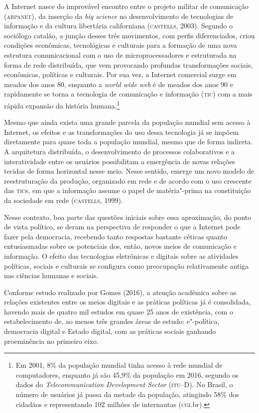 {\noindent{}A Internet nasce do improvável encontro entre o projeto militar de
comunicação (\textsc{arpanet}), da inserção da \textit{big science} no
desenvolvimento de tecnologias de informação e da cultura libertária
californiana (\textsc{castells}, 2003). Segundo o sociólogo catalão, a junção
desses três movimentos, com perfis diferenciados, criou condições
econômicas, tecnológicas e culturais para a formação de uma nova
estrutura comunicacional com o uso de microprocessadores e estruturada
na forma de rede distribuída, que vem provocando profundas
transformações sociais, econômicas, políticas e culturais. Por sua vez,
a Internet comercial surge em meados dos anos 80, enquanto a \textit{world
wide web} é de meados dos anos 90 e rapidamente se torna a tecnologia de
comunicação e informação (\textsc{tic}) com a mais rápida expansão da história
humana.\footnote{Em 2001, 8\% da população mundial tinha acesso à rede
  mundial de computadores, enquanto já são 45,9\% da população em 2016,
  segundo os dados do \textit{Telecommunication Development Sector}
  (\textsc{itu}--D). No Brasil, o número de usuários já passa da metade da
  população, atingindo 58\% dos cidadãos e representando 102 milhões de
  internautas (\textsc{cgi}.br).}

Mesmo que ainda exista uma grande parcela da população mundial sem
acesso à Internet, os efeitos e as transformações do uso dessa
tecnologia já se impõem diretamente para quase toda a população mundial,
mesmo que de forma indireta. A arquitetura distribuída, o
desenvolvimento de processos colaborativos e a interatividade entre os
usuários possibilitam a emergência de novas relações tecidas de forma
horizontal nesse meio. Nesse sentido, emerge um novo modelo de
reestruturação da produção, organizado em rede e de acordo com o uso
crescente das \textsc{tic}s, em que a informação assume o papel de matéria"-prima
na constituição da sociedade em rede (\textsc{castells}, 1999).

Nesse contexto, boa parte das questões iniciais sobre essa aproximação,
do ponto de vista político, se deram na perspectiva de responder o que a
Internet pode fazer pela democracia, recebendo tanto respostas bastante
céticas quanto entusiasmadas sobre os potenciais dos, então, novos meios
de comunicação e informação. O efeito das tecnologias eletrônicas e
digitais sobre as atividades políticas, sociais e culturais se configura
como preocupação relativamente antiga nas ciências humanas e sociais.

Conforme estudo realizado por Gomes (2016), a atenção acadêmica sobre as
relações existentes entre os meios digitais e as práticas políticas já é
consolidada, havendo mais de quatro mil estudos em quase 25 anos de
existência, com o estabelecimento de, ao menos três grandes áreas de
estudo: e"-política, democracia digital e Estado digital, com as práticas
sociais ganhando proeminência no primeiro eixo.

}
